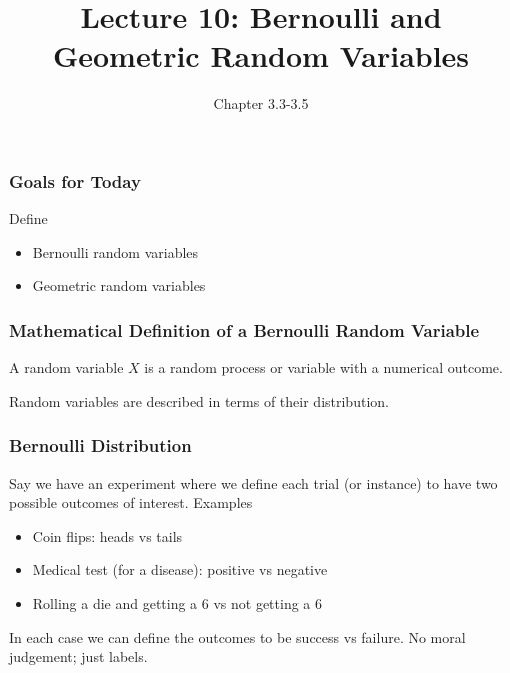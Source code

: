 \documentclass[handout]{beamer}
\title{Lecture 10: Bernoulli and Geometric Random Variables}
\author{Chapter 3.3-3.5}
\date{}
\newcommand{\blue}[1]{\textcolor{blue2}{#1}}
\begin{document}
\begin{frame}
\titlepage
\end{frame}



\begin{frame}[fragile]
\frametitle{Goals for Today}

Define
\begin{itemize}
\item Bernoulli random variables
\item Geometric random variables
\end{itemize}


\end{frame}


\begin{frame}[fragile]
\frametitle{Mathematical Definition of a Bernoulli Random Variable}

A \blue{random variable $X$} is a random process or variable with a numerical outcome.  

\vspace{5cm}

\pause Random variables are described in terms of their \blue{distribution}.
\end{frame}


\begin{frame}
\frametitle{Bernoulli Distribution}
Say we have an experiment where we define each \blue{trial} (or instance) to have two possible outcomes of interest.  Examples
\pause\begin{itemize}
\item Coin flips:  heads vs tails
\item Medical test (for a disease):  positive vs negative
\item Rolling a die and getting a 6 vs not getting a 6
\end{itemize}

\vspace{0.5cm}

\pause In each case we can \blue{define} the outcomes to be \blue{success} vs \blue{failure}.  No moral judgement; just labels.

\end{frame}
\end{document}
